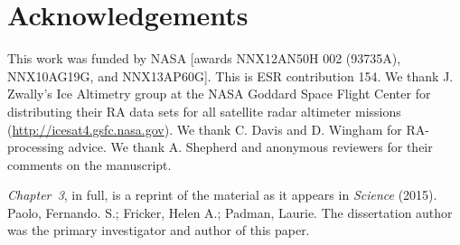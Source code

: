 \clearpage
\section*{Acknowledgements}

\noindent
This work was funded by NASA [awards NNX12AN50H 002
(93735A), NNX10AG19G, and NNX13AP60G]. This is ESR
contribution 154. We thank J. Zwally's Ice Altimetry group
at the NASA Goddard Space Flight Center for distributing their
RA data sets for all satellite radar altimeter missions
(\url{http://icesat4.gsfc.nasa.gov}). We thank C. Davis and D. Wingham for
RA-processing advice. We thank A. Shepherd and anonymous
reviewers for their comments on the manuscript.

{\sl Chapter~3}, in full, is a reprint of the material as it appears in {\it Science}
(2015). Paolo, Fernando. S.; Fricker, Helen A.; Padman, Laurie. The dissertation
author was the primary investigator and author of this paper.

